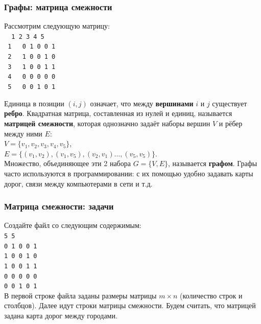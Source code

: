 \begin{frame}
	\frametitle{Графы: матрица смежности}
	Рассмотрим следующую матрицу: \\
	{\tt %
	{\color{gray} \hspace{-4pt} 1 2 3 4 5} \\%
	{\color{gray} 1 \,} 0 1 0 0 1 \\%
	{\color{gray} 2 \,} 1 0 0 1 0 \\%
	{\color{gray} 3 \,} 1 0 0 1 1 \\%
	{\color{gray} 4 \,} 0 0 0 0 0 \\%
	{\color{gray} 5 \,} 0 0 1 0 1 \\}

	Единица в позиции $(i,j)$ означает, что между {\bf вершинами} $i$ и $j$
	существует {\bf ребро}. Квадратная матрица, составленная из нулей и единиц,
	называется {\bf матрицей смежности}, которая однозначно задаёт наборы вершин
	$V$ и рёбер между ними $E$: \\
	$V = \{v_1, v_2, v_3, v_4, v_5\}$, \\
	$E = \{(v_1, v_2), (v_1, v_5), (v_2, v_1) \dots, (v_5, v_5)\}$.\\

	Множество, объединяющее эти 2 набора $G = \{V, E\}$, называется {\bf графом}.
	Графы часто используются в программировании: с их помощью удобно задавать
	карты дорог, связи между компьютерами в сети и т.д.

\end{frame}

\begin{frame}
	\frametitle{Матрица смежности: задачи}
	Создайте файл  со следующим содержимым: \\
	{\tt 5 5 \\ 0 1 0 0 1 \\ 1 0 0 1 0 \\ 1 0 0 1 1 \\ 0 0 0 0 0 \\ 0 0 1 0 1 \\}
	В первой строке файла заданы размеры матрицы $m \times n$ (количество строк и
	столбцов). Далее идут строки матрицы смежности. Будем считать, что матрицей
	задана карта дорог между городами. \\
\end{frame}

